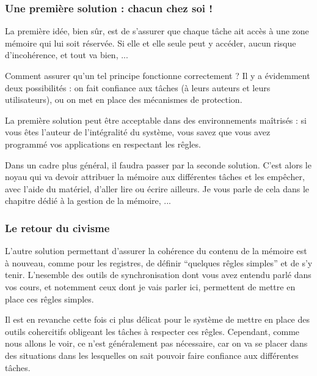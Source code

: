 \subsubsection{Une première solution : chacun chez soi !}

   La première idée, bien sûr, est de s'assurer que chaque tâche ait
accès à une zone mémoire qui lui soit réservée. Si elle et elle seule
peut y accéder, aucun risque d'incohérence, et tout va bien, ...

   Comment assurer qu'un tel principe fonctionne correctement ? Il y a
évidemment deux possibilités : on fait confiance aux tâches (à leurs
auteurs et leurs utilisateurs), ou on met en place des mécanismes de
protection.

   La première solution peut être acceptable dans des environnements
maîtrisés : si vous êtes l'auteur de l'intégralité du système, vous
savez que vous avez programmé vos applications en respectant les
rêgles. 

   Dans un cadre plus général, il faudra passer par la seconde
solution. C'est alors le noyau qui va devoir attribuer la mémoire aux
différentes tâches et les empêcher, avec l'aide du matériel, d'aller
lire ou écrire ailleurs. Je vous parle de cela dans le chapitre dédié
à la gestion de la mémoire, ...

%
\subsubsection{Le retour du civisme}

   L'autre solution permettant d'assurer la cohérence du contenu de la
mémoire est à nouveau, comme pour les registres, de définir ``quelques
rêgles simples'' et de s'y tenir. L'nesemble des outils de
synchronisation dont vous avez entendu parlé dans vos cours, et
notemment ceux dont je vais parler ici, permettent de mettre en place
ces rêgles simples.

   Il est en revanche cette fois ci plus délicat pour le système de
mettre en place des outils cohercitifs obligeant les tâches à
respecter ces rêgles. Cependant, comme nous allons le voir, ce n'est
généralement pas nécessaire, car on va se placer dans des situations
dans les lesquelles on sait pouvoir faire confiance aux différentes
tâches.

%
